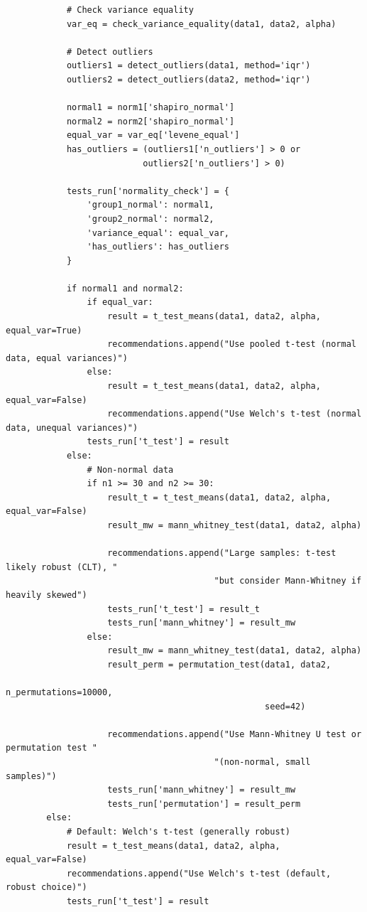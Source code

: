 \begin{lstlisting}
            # Check variance equality
            var_eq = check_variance_equality(data1, data2, alpha)

            # Detect outliers
            outliers1 = detect_outliers(data1, method='iqr')
            outliers2 = detect_outliers(data2, method='iqr')

            normal1 = norm1['shapiro_normal']
            normal2 = norm2['shapiro_normal']
            equal_var = var_eq['levene_equal']
            has_outliers = (outliers1['n_outliers'] > 0 or
                           outliers2['n_outliers'] > 0)

            tests_run['normality_check'] = {
                'group1_normal': normal1,
                'group2_normal': normal2,
                'variance_equal': equal_var,
                'has_outliers': has_outliers
            }

            if normal1 and normal2:
                if equal_var:
                    result = t_test_means(data1, data2, alpha, equal_var=True)
                    recommendations.append("Use pooled t-test (normal data, equal variances)")
                else:
                    result = t_test_means(data1, data2, alpha, equal_var=False)
                    recommendations.append("Use Welch's t-test (normal data, unequal variances)")
                tests_run['t_test'] = result
            else:
                # Non-normal data
                if n1 >= 30 and n2 >= 30:
                    result_t = t_test_means(data1, data2, alpha, equal_var=False)
                    result_mw = mann_whitney_test(data1, data2, alpha)

                    recommendations.append("Large samples: t-test likely robust (CLT), "
                                         "but consider Mann-Whitney if heavily skewed")
                    tests_run['t_test'] = result_t
                    tests_run['mann_whitney'] = result_mw
                else:
                    result_mw = mann_whitney_test(data1, data2, alpha)
                    result_perm = permutation_test(data1, data2,
                                                   n_permutations=10000,
                                                   seed=42)

                    recommendations.append("Use Mann-Whitney U test or permutation test "
                                         "(non-normal, small samples)")
                    tests_run['mann_whitney'] = result_mw
                    tests_run['permutation'] = result_perm
        else:
            # Default: Welch's t-test (generally robust)
            result = t_test_means(data1, data2, alpha, equal_var=False)
            recommendations.append("Use Welch's t-test (default, robust choice)")
            tests_run['t_test'] = result


\end{lstlisting}

